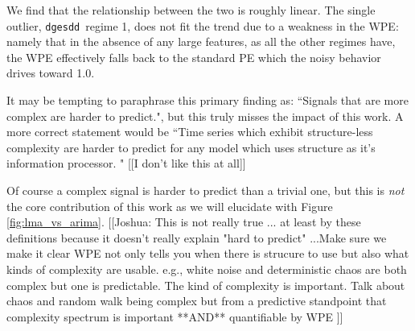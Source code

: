 \documentclass{article}
\newcommand{\gcc}{{\tt 403.gcc}~}
\newcommand{\svd}{{\tt dgesdd}~}
\newcommand{\col}{{\tt col\_major}~}
\begin{document}



















We find that the relationship between the two is roughly linear. The single
outlier, \svd regime 1, does not fit the trend due to a weakness in the WPE:
namely that in the absence of any large features, as all the other regimes have,
the WPE effectively falls back to the standard PE which the noisy behavior
drives toward 1.0.



It may be tempting to paraphrase this primary finding as: ``Signals that are more complex are harder to predict.", but this truly misses the impact of this work. A more correct statement would be ``Time series which exhibit structure-less complexity are harder to predict for any model which uses structure as it's information processor. " [[I don't like this at all]] 




Of course a complex signal is harder to predict than a trivial one, but this is \emph{not} the core contribution of this work as we will elucidate with Figure \ref{fig:lma_vs_arima}. [[Joshua: This is not really true ... at least by these definitions because it doesn't really explain "hard to predict" ...Make sure we make it clear WPE not only tells you when there is strucure to use but also what kinds of complexity are usable. e.g., white noise and deterministic chaos are both complex but one is predictable. The kind of complexity is important. Talk about chaos and random walk being complex but from a predictive standpoint that complexity spectrum is important **AND** quantifiable by WPE ]]
\end{document}
